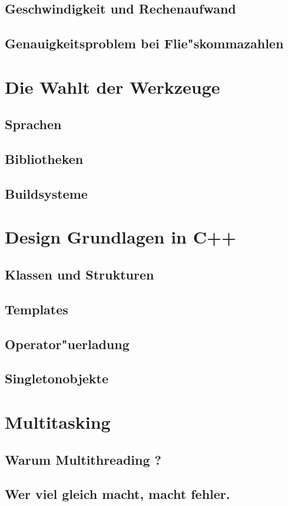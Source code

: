 \documentclass[14pt, a4paper]{report}
\begin{document}
\section{Geschwindigkeit und Rechenaufwand}
\section{Genauigkeitsproblem bei Flie"skommazahlen}

\chapter{Die Wahlt der Werkzeuge}
\section{Sprachen}
\section{Bibliotheken}
\section{Buildsysteme}

\chapter{Design Grundlagen in C++}
\section{Klassen und Strukturen}
\section{Templates}
\section{Operator"uerladung}
\section{Singletonobjekte}

\chapter{Multitasking}
\section{Warum Multithreading ?}
\section{Wer viel gleich macht, macht fehler.}
\end{document}
